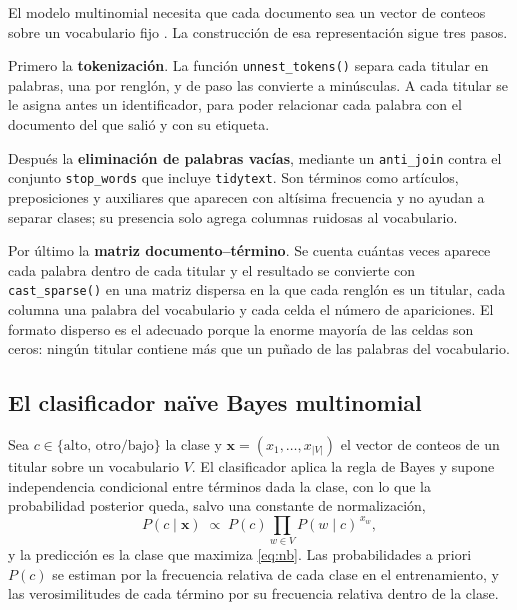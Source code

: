 \documentclass[11pt, a4paper]{article}
\begin{document}
El modelo multinomial necesita que cada documento sea un vector de conteos sobre un vocabulario
fijo \cite{manning2008}. La construcción de esa representación sigue tres pasos.

Primero la \textbf{tokenización}. La función \texttt{unnest\_tokens()} separa cada titular en
palabras, una por renglón, y de paso las convierte a minúsculas. A cada titular se le asigna antes
un identificador, para poder relacionar cada palabra con el documento del que salió y con su
etiqueta.

Después la \textbf{eliminación de palabras vacías}, mediante un \texttt{anti\_join} contra el
conjunto \texttt{stop\_words} que incluye \texttt{tidytext}. Son términos como artículos,
preposiciones y auxiliares que aparecen con altísima frecuencia y no ayudan a separar clases; su
presencia solo agrega columnas ruidosas al vocabulario.

Por último la \textbf{matriz documento--término}. Se cuenta cuántas veces aparece cada palabra
dentro de cada titular y el resultado se convierte con \texttt{cast\_sparse()} en una matriz
dispersa en la que cada renglón es un titular, cada columna una palabra del vocabulario y cada
celda el número de apariciones. El formato disperso es el adecuado porque la enorme mayoría de las
celdas son ceros: ningún titular contiene más que un puñado de las palabras del vocabulario.

\subsection{El clasificador naïve Bayes multinomial}

Sea $c \in \{\text{alto},\, \text{otro/bajo}\}$ la clase y $\mathbf{x} = (x_1,\ldots,x_{|V|})$ el
vector de conteos de un titular sobre un vocabulario $V$. El clasificador aplica la regla de Bayes
y supone independencia condicional entre términos dada la clase, con lo que la probabilidad
posterior queda, salvo una constante de normalización,
\begin{equation}
    P(c \mid \mathbf{x}) \;\propto\; P(c) \prod_{w \in V} P(w \mid c)^{\,x_w},
    \label{eq:nb}
\end{equation}
y la predicción es la clase que maximiza \eqref{eq:nb}. Las probabilidades a priori $P(c)$ se
estiman por la frecuencia relativa de cada clase en el entrenamiento, y las verosimilitudes de
cada término por su frecuencia relativa dentro de la clase.
\end{document}
